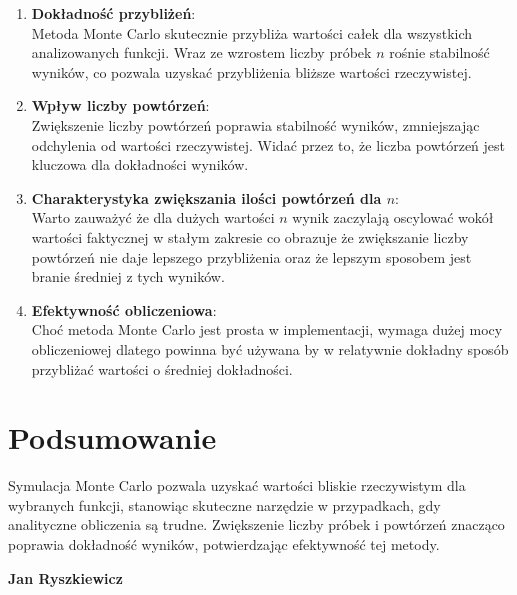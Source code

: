 \documentclass{article}
\begin{document}
\begin{enumerate}
    \item \textbf{Dokładność przybliżeń}: \\
    Metoda Monte Carlo skutecznie przybliża wartości całek dla wszystkich analizowanych funkcji. Wraz ze wzrostem liczby próbek \( n \) rośnie stabilność wyników, co pozwala uzyskać przybliżenia bliższe wartości rzeczywistej.
    
    \item \textbf{Wpływ liczby powtórzeń}: \\
    Zwiększenie liczby powtórzeń poprawia stabilność wyników, zmniejszając odchylenia od wartości rzeczywistej. Widać przez to, że liczba powtórzeń jest kluczowa dla dokładności wyników.
    
    \item \textbf{Charakterystyka zwiększania ilości powtórzeń dla \( n\)}: \\
    Warto zauważyć że dla dużych wartości \( n\) wynik zaczylają oscylować wokół wartości faktycznej w stałym zakresie co obrazuje że zwiększanie liczby powtórzeń nie daje lepszego przybliżenia oraz że lepszym sposobem jest branie średniej z tych wyników.
    
    \item \textbf{Efektywność obliczeniowa}: \\
    Choć metoda Monte Carlo jest prosta w implementacji, wymaga dużej mocy obliczeniowej dlatego powinna być używana by w relatywnie dokładny sposób przybliżać wartości o średniej dokładności.
\end{enumerate}

\section*{Podsumowanie}

Symulacja Monte Carlo pozwala uzyskać wartości bliskie rzeczywistym dla wybranych funkcji, stanowiąc skuteczne narzędzie w przypadkach, gdy analityczne obliczenia są trudne. Zwiększenie liczby próbek i powtórzeń znacząco poprawia dokładność wyników, potwierdzając efektywność tej metody.
\vspace{1cm} 

\hfill
\textbf{Jan Ryszkiewicz}
\end{document}
